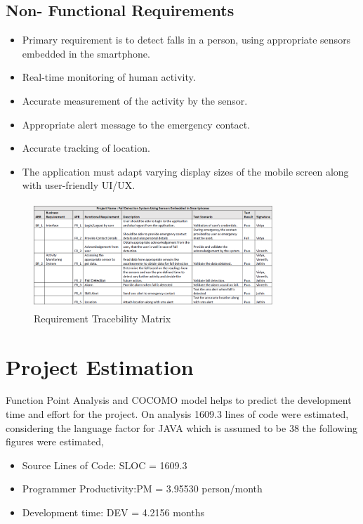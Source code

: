 \documentclass[conference]{IEEEtran}
\begin{document}
\subsection{Non- Functional Requirements}
\begin{itemize}
\item Primary requirement is to detect falls in a person, using appropriate sensors embedded in the smartphone.
\item Real-time monitoring of human activity.
\item Accurate measurement of the activity by the sensor.
\item Appropriate alert message to the emergency contact.
\item Accurate tracking of location.
\item The application must adapt varying display sizes of the mobile screen along with user-friendly UI/UX.
\end{itemize}

\begin{figure}
\centerline{\includegraphics[width=9cm,height=4cm]{RTM_V2.PNG}}
\caption{Requirement Tracebility Matrix}
\label{fig2}
\end{figure}

\section{Project Estimation}
Function Point Analysis and COCOMO model\cite{b4} helps to predict the development time and effort for the project. On analysis 1609.3 lines of code were estimated, considering the language factor for JAVA which is assumed to be 38 the following figures were estimated,
 \begin{itemize}
\item Source Lines of Code: SLOC = 1609.3
\item Programmer Productivity:PM = 3.95530 person/month
\item Development time: DEV = 4.2156 months
\end{itemize}
\end{document}
